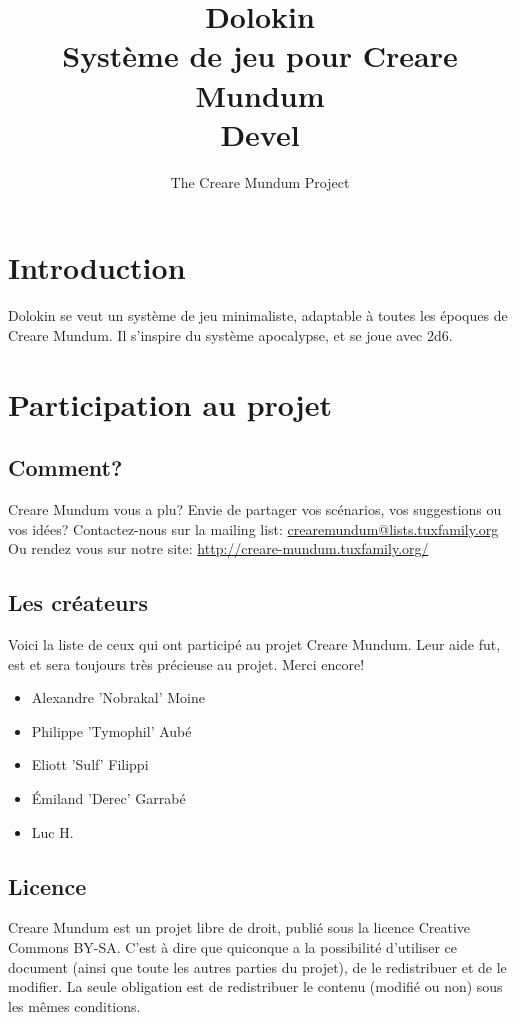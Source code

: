 \documentclass[a4paper, 11pt]{article}
\title{Dolokin \\ Système de jeu pour Creare Mundum \\ Devel}
\author{The Creare Mundum Project}
\date{\oldstylenums{\insertdate}}
\begin{document}
\maketitle
\setcounter{tocdepth}{1} %
\renewcommand{\contentsname}{Sommaire} 
\tableofcontents
\newpage

\section{Introduction}
Dolokin se veut un système de jeu minimaliste, adaptable à toutes les époques de Creare Mundum. Il s'inspire du système apocalypse, et se joue avec 2d6.


\newpage
\section{Participation au projet}
\subsection{Comment?}
\hypertarget{participation}{}
Creare Mundum vous a plu? 
Envie de partager vos scénarios, vos suggestions ou vos idées?
\newline
Contactez-nous sur la mailing list: \href {mailto:crearemundum@lists.tuxfamily.org}{crearemundum@lists.tuxfamily.org}
\newline
Ou rendez vous sur notre site: \href {http://creare-mundum.tuxfamily.org/} {http://creare-mundum.tuxfamily.org/}
\subsection{Les créateurs}
Voici la liste de ceux qui ont participé au projet Creare Mundum. Leur aide fut, est et sera toujours très précieuse au projet. Merci encore!  
\begin{itemize}
\item Alexandre ’Nobrakal’ Moine 
\item Philippe ’Tymophil’ Aubé 
\item Eliott ’Sulf’ Filippi
\item Émiland ’Derec’ Garrabé
\item Luc H.
\end{itemize}
\subsection{Licence}
Creare Mundum est un projet libre de droit, publié sous la licence Creative Commons BY-SA. C'est à dire que quiconque a la possibilité d'utiliser ce document (ainsi que toute les autres parties du projet), de le redistribuer et de le modifier. La seule obligation est de redistribuer le contenu (modifié ou non) sous les mêmes conditions.
\end{document}
